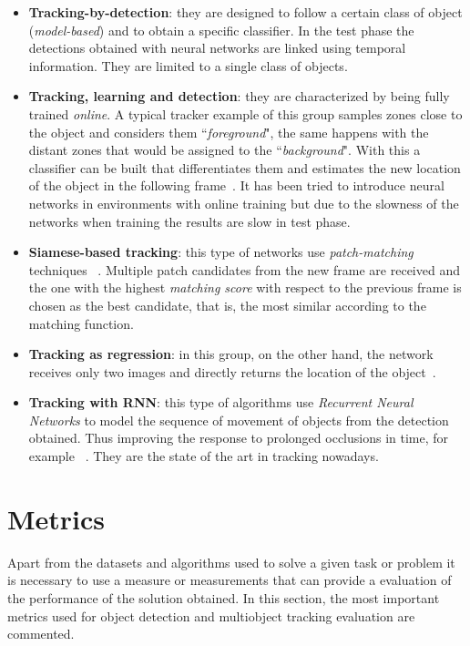 \begin{itemize}
\item \textbf{Tracking-by-detection}: they are designed to follow a certain class of object (\textit{model-based}) and to obtain a specific classifier. In the test phase the detections obtained with neural networks are linked using temporal information. They are limited to a single class of objects.
\item \textbf{Tracking, learning and detection}: they are characterized by being fully trained \textit{online}. A typical tracker example of this group samples zones close to the object and considers them ``\textit{foreground}", the same happens with the distant zones that would be assigned to the ``\textit{background}". With this a classifier can be built that differentiates them and estimates the new location of the object in the following frame~\cite{babenko2009visual}. It has been tried to introduce neural networks in environments with online training but due to the slowness of the networks when training the results are slow in test phase.
\item \textbf{Siamese-based tracking}: this type of networks use \textit{patch-matching} techniques ~\cite{tao2016siamese}.   Multiple patch candidates from the new frame are received and the one with the highest \textit{matching score} with respect to the previous frame is chosen as the best candidate, that is, the most similar according to the matching function.
\item \textbf{Tracking as regression}: in this group, on the other hand, the network receives only two images and directly returns the location of the object~\cite{held2016learning}.
\item \textbf{Tracking with RNN}: this type of algorithms use \textit{Recurrent Neural Networks} to model the sequence of movement of objects from the detection obtained. Thus improving the response to prolonged occlusions in time, for example ~\cite{sadeghian2017tracking}. They are the state of the art in tracking nowadays.
\end{itemize}
\section{Metrics}
Apart from the datasets and algorithms used to solve a given task or problem it is necessary to use a measure or measurements that can provide a evaluation of the performance of the solution obtained. In this section, the most important metrics used for object detection and multiobject tracking evaluation are commented.
